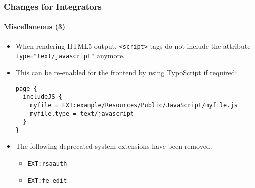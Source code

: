 \begin{frame}[fragile]
	\frametitle{Changes for Integrators}
	\framesubtitle{Miscellaneous (3)}

	\lstset{basicstyle=\tiny\ttfamily}

	\begin{itemize}

		\item When rendering HTML5 output, \texttt{<script>} tags do not include
			the attribute \texttt{type="text/javascript"} anymore.

		\item This can be re-enabled for the frontend by using TypoScript if required:

\begin{lstlisting}
page {
  includeJS {
    myfile = EXT:example/Resources/Public/JavaScript/myfile.js
    myfile.type = text/javascript
  }
}
\end{lstlisting}

		\item The following deprecated system extensions have been removed:

			\begin{itemize}
				\item \texttt{EXT:rsaauth}
				\item \texttt{EXT:fe\_edit}
			\end{itemize}

	\end{itemize}

\end{frame}

